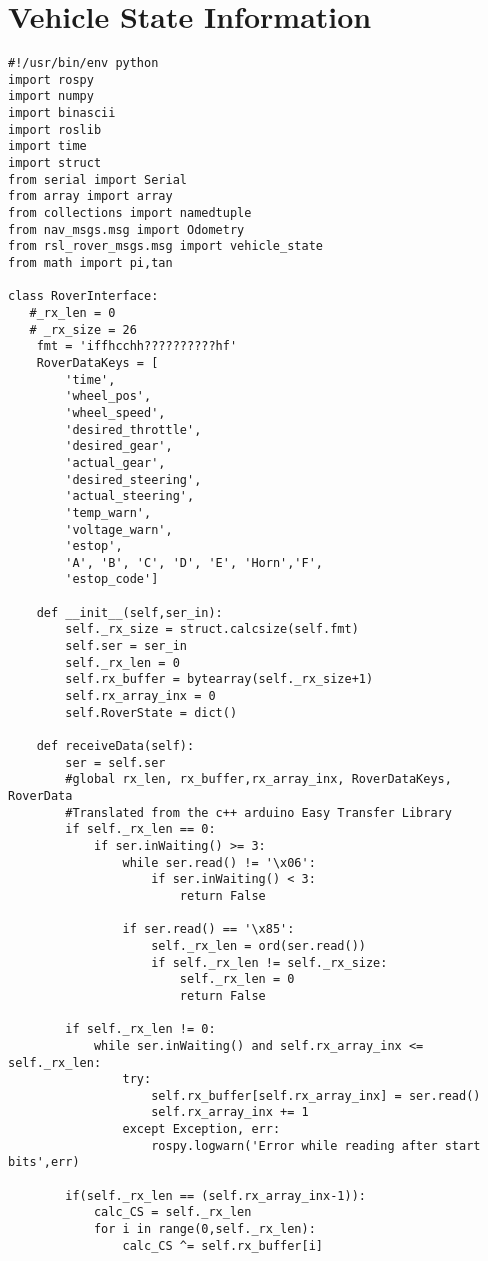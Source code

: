 \section{Vehicle State Information}
\begin{verbatim}
#!/usr/bin/env python
import rospy
import numpy
import binascii
import roslib
import time
import struct
from serial import Serial
from array import array
from collections import namedtuple
from nav_msgs.msg import Odometry
from rsl_rover_msgs.msg import vehicle_state
from math import pi,tan

class RoverInterface: 
   #_rx_len = 0
   # _rx_size = 26
    fmt = 'iffhcchh??????????hf'
    RoverDataKeys = [
        'time',
        'wheel_pos',
        'wheel_speed',
        'desired_throttle',
        'desired_gear',
        'actual_gear',
        'desired_steering',
        'actual_steering',
        'temp_warn',
        'voltage_warn',
        'estop',
        'A', 'B', 'C', 'D', 'E', 'Horn','F',
        'estop_code']

    def __init__(self,ser_in):
        self._rx_size = struct.calcsize(self.fmt)
        self.ser = ser_in
        self._rx_len = 0
        self.rx_buffer = bytearray(self._rx_size+1)
        self.rx_array_inx = 0
        self.RoverState = dict()

    def receiveData(self):
        ser = self.ser
        #global rx_len, rx_buffer,rx_array_inx, RoverDataKeys, RoverData
        #Translated from the c++ arduino Easy Transfer Library
        if self._rx_len == 0:
            if ser.inWaiting() >= 3:
                while ser.read() != '\x06':
                    if ser.inWaiting() < 3:
                        return False

                if ser.read() == '\x85':
                    self._rx_len = ord(ser.read())
                    if self._rx_len != self._rx_size:
                        self._rx_len = 0
                        return False
        
        if self._rx_len != 0:
            while ser.inWaiting() and self.rx_array_inx <= self._rx_len:
                try:
                    self.rx_buffer[self.rx_array_inx] = ser.read()
                    self.rx_array_inx += 1
                except Exception, err:
                    rospy.logwarn('Error while reading after start bits',err)

        if(self._rx_len == (self.rx_array_inx-1)):
            calc_CS = self._rx_len
            for i in range(0,self._rx_len):
                calc_CS ^= self.rx_buffer[i]


\end{verbatim}

